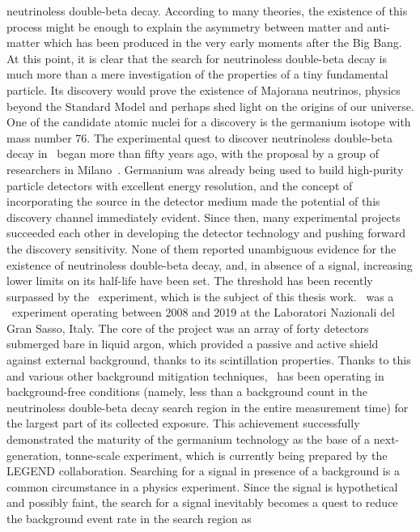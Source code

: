 neutrinoless double-beta decay. According to many theories, the existence of this process
might be enough to explain the asymmetry between matter and anti-matter which has been
produced in the very early moments after the Big Bang. At this point, it is clear that
the search for neutrinoless double-beta decay is much more than a mere investigation of
the properties of a tiny fundamental particle. Its discovery would prove the existence of
Majorana neutrinos, physics beyond the Standard Model and perhaps shed light on the
origins of our universe.
\newpar
{}
One of the candidate atomic nuclei for a discovery is the germanium isotope with mass
number 76. The experimental quest to discover neutrinoless double-beta decay in \gesix\
began more than fifty years ago, with the proposal by a group of researchers in
Milano~\cite{Fiorini1967}.  Germanium was already being used to build high-purity particle
detectors with excellent energy resolution, and the concept of incorporating the source in
the detector medium made the potential of this discovery channel immediately evident.
Since then, many experimental projects succeeded each other in developing the detector
technology and pushing forward the discovery sensitivity. None of them reported
unambiguous evidence for the existence of neutrinoless double-beta decay, and, in absence
of a signal, increasing lower limits on its half-life have been set. The \powtenyr{26}
threshold has been recently surpassed by the \gerda\ experiment, which is the subject of
this thesis work. \gerda\ was a \gesix\ experiment operating between 2008 and 2019 at the
Laboratori Nazionali del Gran Sasso, Italy. The core of the project was an array of forty
detectors submerged bare in liquid argon, which provided a passive and active shield
against external background, thanks to its scintillation properties. Thanks to this and
various other background mitigation techniques, \gerda\ has been operating in
background-free conditions (namely, less than a background count in the neutrinoless
double-beta decay search region in the entire measurement time) for the largest part of
its collected exposure. This achievement successfully demonstrated the maturity of the
germanium technology as the base of a next-generation, tonne-scale experiment, which is
currently being prepared by the LEGEND collaboration.
\newpar
Searching for a signal in presence of a background is a common circumstance in a physics
experiment. Since the signal is hypothetical and possibly faint, the search for a signal
inevitably becomes a quest to reduce the background event rate in the search region as
